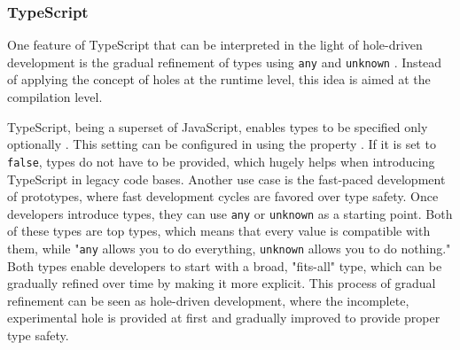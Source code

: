 \subsubsection{TypeScript}
One feature of TypeScript that can be interpreted in the light of hole-driven development is the gradual refinement of types using \texttt{any} and \texttt{unknown} \cite{baumgartner_typescript_2023}.
Instead of applying the concept of holes at the runtime level, this idea is aimed at the compilation level.

TypeScript, being a superset of JavaScript, enables types to be specified only optionally \cite{baumgartner_typescript_2023}.
This setting can be configured in \texttt{} using the property \texttt{}.
If it is set to \texttt{false}, types do not have to be provided, which hugely helps when introducing TypeScript in legacy code bases.
Another use case is the fast-paced development of prototypes, where fast development cycles are favored over type safety.
Once developers introduce types, they can use \texttt{any} or \texttt{unknown} as a starting point.
Both of these types are top types, which means that every value is compatible with them, while "\texttt{any} allows you to do everything, \texttt{unknown} allows you to do nothing." \cite{baumgartner_typescript_2023}
Both types enable developers to start with a broad, "fits-all" type, which can be gradually refined over time by making it more explicit.
This process of gradual refinement can be seen as hole-driven development, where the incomplete, experimental hole is provided at first and gradually improved to provide proper type safety.

